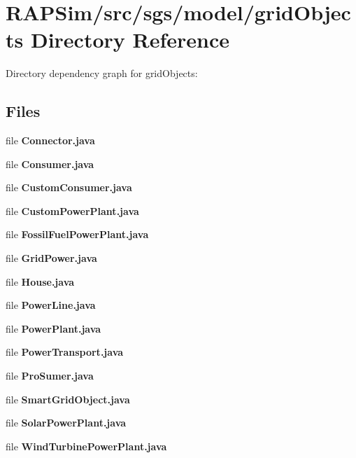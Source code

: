 \section{R\-A\-P\-Sim/src/sgs/model/grid\-Objects Directory Reference}
\label{dir_2330b398352ac95b3de030165ab5d101}
Directory dependency graph for grid\-Objects\-:
\subsection*{Files}
\begin{DoxyCompactItemize}
\item 
file {\bf Connector.\-java}
\item 
file {\bf Consumer.\-java}
\item 
file {\bf Custom\-Consumer.\-java}
\item 
file {\bf Custom\-Power\-Plant.\-java}
\item 
file {\bf Fossil\-Fuel\-Power\-Plant.\-java}
\item 
file {\bf Grid\-Power.\-java}
\item 
file {\bf House.\-java}
\item 
file {\bf Power\-Line.\-java}
\item 
file {\bf Power\-Plant.\-java}
\item 
file {\bf Power\-Transport.\-java}
\item 
file {\bf Pro\-Sumer.\-java}
\item 
file {\bf Smart\-Grid\-Object.\-java}
\item 
file {\bf Solar\-Power\-Plant.\-java}
\item 
file {\bf Wind\-Turbine\-Power\-Plant.\-java}
\end{DoxyCompactItemize}
